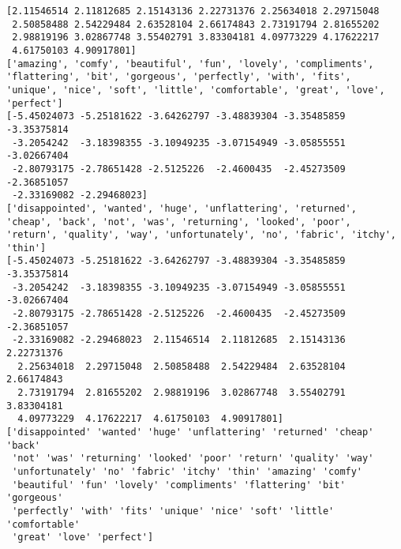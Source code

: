 \documentclass[11pt]{article}
\begin{document}
    \begin{Verbatim}[commandchars=\\\{\}]
[2.11546514 2.11812685 2.15143136 2.22731376 2.25634018 2.29715048
 2.50858488 2.54229484 2.63528104 2.66174843 2.73191794 2.81655202
 2.98819196 3.02867748 3.55402791 3.83304181 4.09773229 4.17622217
 4.61750103 4.90917801]
['amazing', 'comfy', 'beautiful', 'fun', 'lovely', 'compliments', 'flattering', 'bit', 'gorgeous', 'perfectly', 'with', 'fits', 'unique', 'nice', 'soft', 'little', 'comfortable', 'great', 'love', 'perfect']
[-5.45024073 -5.25181622 -3.64262797 -3.48839304 -3.35485859 -3.35375814
 -3.2054242  -3.18398355 -3.10949235 -3.07154949 -3.05855551 -3.02667404
 -2.80793175 -2.78651428 -2.5125226  -2.4600435  -2.45273509 -2.36851057
 -2.33169082 -2.29468023]
['disappointed', 'wanted', 'huge', 'unflattering', 'returned', 'cheap', 'back', 'not', 'was', 'returning', 'looked', 'poor', 'return', 'quality', 'way', 'unfortunately', 'no', 'fabric', 'itchy', 'thin']
[-5.45024073 -5.25181622 -3.64262797 -3.48839304 -3.35485859 -3.35375814
 -3.2054242  -3.18398355 -3.10949235 -3.07154949 -3.05855551 -3.02667404
 -2.80793175 -2.78651428 -2.5125226  -2.4600435  -2.45273509 -2.36851057
 -2.33169082 -2.29468023  2.11546514  2.11812685  2.15143136  2.22731376
  2.25634018  2.29715048  2.50858488  2.54229484  2.63528104  2.66174843
  2.73191794  2.81655202  2.98819196  3.02867748  3.55402791  3.83304181
  4.09773229  4.17622217  4.61750103  4.90917801]
['disappointed' 'wanted' 'huge' 'unflattering' 'returned' 'cheap' 'back'
 'not' 'was' 'returning' 'looked' 'poor' 'return' 'quality' 'way'
 'unfortunately' 'no' 'fabric' 'itchy' 'thin' 'amazing' 'comfy'
 'beautiful' 'fun' 'lovely' 'compliments' 'flattering' 'bit' 'gorgeous'
 'perfectly' 'with' 'fits' 'unique' 'nice' 'soft' 'little' 'comfortable'
 'great' 'love' 'perfect']

    \end{Verbatim}

    \begin{center}
    \end{center}
    { \hspace*{\fill} \\}
    
\end{document}
